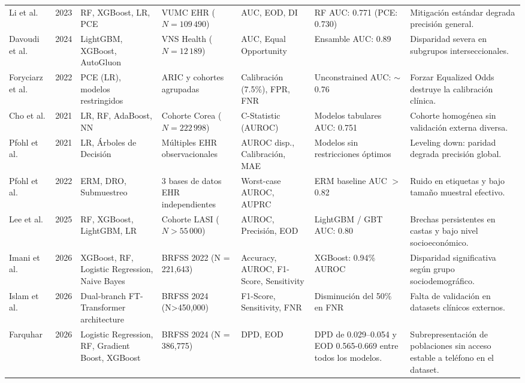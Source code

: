 \documentclass[conference]{IEEEtran}
\begin{document}
\begin{table}[t]
\begin{tabular}{@{}p{1.5cm}p{0.5cm}p{2.8cm}p{2.4cm}p{2.0cm}p{2.3cm}p{3.0cm}@{}}
Li et al. \cite{li2023evaluating} & 2023 & RF, XGBoost, LR, PCE & VUMC EHR ($N=109\,490$) & AUC, EOD, DI & RF AUC: 0.771 (PCE: 0.730) & Mitigación estándar degrada precisión general. \\
Davoudi et al. \cite{davoudi2024fairness} & 2024 & LightGBM, XGBoost, AutoGluon & VNS Health ($N=12\,189$) & AUC, Equal Opportunity & Ensamble AUC: 0.89 & Disparidad severa en subgrupos interseccionales. \\
Foryciarz et al. \cite{foryciarz2022evaluating} & 2022 & PCE (LR), modelos restringidos & ARIC y cohortes agrupadas & Calibración (7.5\%), FPR, FNR & Unconstrained AUC: $\sim$0.76 & Forzar Equalized Odds destruye la calibración clínica. \\
Cho et al. \cite{cho2021preexisting} & 2021 & LR, RF, AdaBoost, NN & Cohorte Corea ($N=222\,998$) & C-Statistic (AUROC) & Modelos tabulares AUC: 0.751 & Cohorte homogénea sin validación externa diversa. \\
Pfohl et al. \cite{pfohl2021empirical} & 2021 & LR, Árboles de Decisión & Múltiples EHR observacionales & AUROC disp., Calibración, MAE & Modelos sin restricciones óptimos & Leveling down: paridad degrada precisión global. \\
Pfohl et al. \cite{pfohl2022comparison} & 2022 & ERM, DRO, Submuestreo & 3 bases de datos EHR independientes & Worst-case AUROC, AUPRC & ERM baseline AUC $>$ 0.82 & Ruido en etiquetas y bajo tamaño muestral efectivo. \\
Lee et al. \cite{lee2025evaluating} & 2025 & RF, XGBoost, LightGBM, LR & Cohorte LASI ($N>55\,000$) & AUROC, Precisión, EOD & LightGBM / GBT AUC: 0.80 & Brechas persistentes en castas y bajo nivel socioeconómico. \\
Imani et al. \cite{imani2026predicting} & 2026 & XGBoost, RF, Logistic Regression, Naive Bayes & BRFSS 2022 (N = 221,643) & Accuracy, AUROC, F1-Score, Sensitivity & XGBoost: 0.94\% AUROC & Disparidad significativa según grupo sociodemográfico. \\
Islam et al. \cite{islam2026leakage} & 2026 & Dual-branch FT-Transformer architecture & BRFSS 2024 (N>450,000) & F1-Score, Sensitivity, FNR & Disminución del 50\% en FNR &  Falta de validación en datasets clínicos externos. \\
Farquhar \cite{farquhar2026persistent} & 2026 & Logistic Regression, RF, Gradient Boost, XGBoost & BRFSS 2024 (N = 386,775) & DPD, EOD & DPD de 0.029–0.054 y EOD 0.565-0.669 entre todos los modelos. & Subrepresentación de poblaciones sin acceso estable a teléfono en el dataset. \\

\end{tabular}
\end{table}
\end{document}
